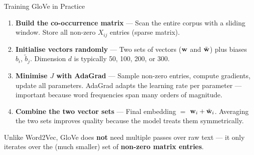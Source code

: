 \documentclass[11pt,aspectratio=169,professionalfonts]{beamer}
\begin{document}
%
%
\begin{frame}{Training GloVe in Practice}
  \begin{enumerate}
    \item \textbf{Build the co-occurrence matrix} ---
      Scan the entire corpus with a sliding window.
      Store all non-zero $X_{ij}$ entries (sparse matrix).

    \vspace{4pt}
    \item \textbf{Initialise vectors randomly} ---
      Two sets of vectors ($\mathbf{w}$ and $\tilde{\mathbf{w}}$) plus biases $b_i$, $\tilde{b}_j$.
      Dimension $d$ is typically 50, 100, 200, or 300.

    \vspace{4pt}
    \item \textbf{Minimise $J$ with AdaGrad} ---
      Sample non-zero entries, compute gradients, update all parameters.
      AdaGrad adapts the learning rate per parameter --- important because word frequencies span many orders of magnitude.

    \vspace{4pt}
    \item \textbf{Combine the two vector sets} ---
      Final embedding $=$ $\mathbf{w}_i + \tilde{\mathbf{w}}_i$.
      Averaging the two sets improves quality because the model treats them symmetrically.
  \end{enumerate}

  \vspace{4pt}
  Unlike Word2Vec, GloVe does \textbf{not} need multiple passes over raw text --- it only iterates over the (much smaller) set of \textbf{non-zero matrix entries}.
\end{frame}
%
%
\end{document}
